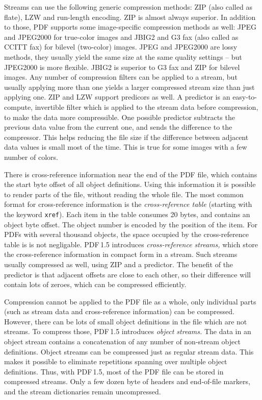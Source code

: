 \documentclass{article}
\begin{document}
Streams can use the following generic compression methods: ZIP (also called
as flate), LZW and run-length encoding. ZIP is almost always superior. In
addition to those, PDF supports some image-specific compression methods as
well: JPEG and JPEG2000 for true-color images and JBIG2 and G3 fax (also
called as CCITT fax) for bilevel (two-color) images. JPEG and JPEG2000 are
lossy methods, they usually yield the same size at the same quality
settings -- but JPEG2000 is more flexible. JBIG2 is superior to G3 fax and
ZIP for bilevel images. Any number of compression filters can be applied to
a stream, but usually applying more than one yields a larger compressed
stream size than just applying one. ZIP and LZW support predicors as well. A
predictor is an easy-to-compute, invertible filter which is applied to the
stream data before compression, to make the data more compressible. One
possible predictor subtracts the previous data value from the current one,
and sends the difference to the compressor. This helps reducing the file
size if the difference between adjacent data values is small most of the
time. This is true for some images with a few number of colors.

There is cross-reference information near the end of the PDF file, which
contains the start byte offset of all object definitions. Using this
information it is possible to render parts of the file, without reading the
whole file. The most common format for cross-reference information is the
\emph{cross-reference table} (starting with the keyword \texttt{xref}). Each item
in the table consumes 20 bytes, and contains an object byte offset. The
object number is encoded by the position of the item. For PDFs with several
thousand objects, the space occupied by the cross-reference table is is not
negligable. PDF\,1.5 introduces \emph{cross-reference streams,} which store
the cross-reference information in compact form in a stream. Such streams
usually compressed as well, using ZIP and a predictor. The benefit of the
predictor is that adjacent offsets are close to each other, so their
difference will contain lots of zeroes, which can be compressed efficiently.

Compression cannot be applied to the PDF file as a whole, only individual
parts (such as stream data and cross-reference information) can be
compressed. However, there can be lots of small object definitions in the
file which are not streams. To compress those, PDF\,1.5 introduces
\emph{object streams.} The data in an object stream contains a concatenation
of any number of non-stream object definitions. Object streams can be
compressed just as regular stream data. This makes it possible to eliminate
repetitions spanning over multiple object definitions. Thus, with PDF\,1.5,
most of the PDF file can be stored in compressed streams. Only a few dozen
byte of headers and end-of-file markers, and the stream dictionaries remain
uncompressed.
\end{document}
